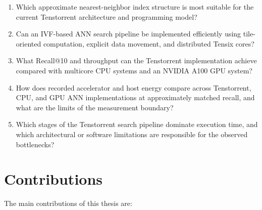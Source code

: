 \begin{enumerate}
\item Which approximate nearest-neighbor index structure is most suitable for the current Tenstorrent architecture and programming model?

\item Can an IVF-based ANN search pipeline be implemented efficiently using tile-oriented computation, explicit data movement, and distributed Tensix cores?

\item What Recall@10 and throughput can the Tenstorrent implementation achieve compared with multicore CPU systems and an NVIDIA A100 GPU system?

\item How does recorded accelerator and host energy compare across Tenstorrent, CPU, and GPU ANN implementations at approximately matched recall, and what are the limits of the measurement boundary?

\item Which stages of the Tenstorrent search pipeline dominate execution time, and which architectural or software limitations are responsible for the observed bottlenecks?

\end{enumerate}

\section{Contributions}

The main contributions of this thesis are:

